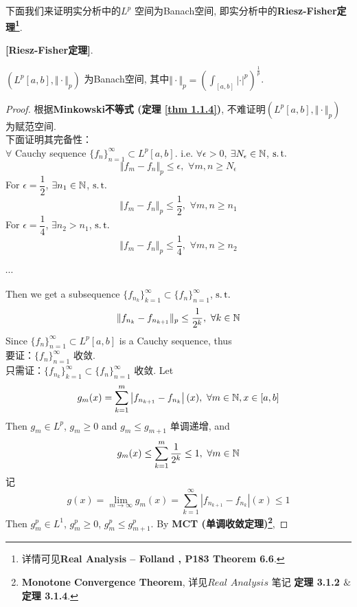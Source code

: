 	
	\vspace{6em}
	下面我们来证明实分析中的$L^p$ 空间为Banach空间, 即实分析中的\textbf{Riesz-Fisher定理\footnote{详情可见\textbf{Real Analysis -- Folland , P183 Theorem 6.6}.}}. 
	\begin{thm}\label{thm 2.1.1}
		\textbf{[Riesz-Fisher定理]}. 
		\begin{center}
			$(L^{p}[a , b] , \Vert \cdot \Vert_p)$ 为Banach空间, 其中$\Vert \cdot \Vert_p = \left( \int_{[a , b]} \left| \cdot \right|^p \right)^{\tfrac{1}{p}}$. 
		\end{center}
		
		\vspace{6em}
		
		\begin{proof}
			根据\textbf{Minkowski不等式 (定理 \ref{thm 1.1.4})}, 不难证明$(L^{p}[a,  b] , \Vert \cdot \Vert_{p})$ 为赋范空间. \\
			下面证明其完备性：\\
			$\forall$ Cauchy sequence $\{ f_n \}_{n = 1}^{\infty} \subset L^{p}[a , b]$. i.e. $\forall \epsilon > 0$, $\exists N_\epsilon \in \mathbb{N}$, $\operatorname{s.t.}$
			\[ \Vert f_m - f_n \Vert_{p} \leq \epsilon , \,\, \forall m , n \geq N_\epsilon \]
			For $\epsilon = \dfrac{1}{2}$, $\exists n_1 \in \mathbb{N}$, $\operatorname{s.t.}$
			\[ \Vert f_m - f_n \Vert_{p} \leq \frac{1}{2} , \,\, \forall m , n \geq n_1 \]
			For $\epsilon = \dfrac{1}{4}$, $\exists n_2 > n_1$, $\operatorname{s.t.}$
			\[ \Vert f_m - f_n \Vert_{p} \leq \frac{1}{4} , \,\, \forall m , n \geq n_2 \]
			\begin{center}
				$\cdots$
			\end{center}
			Then we get a subsequence $\{ f_{n_k} \}_{k = 1}^{\infty} \subset \{ f_n \}_{n = 1}^{\infty}$, $\operatorname{s.t.}$
			\[ \Vert f_{n_k} - f_{n_{k + 1}} \Vert_p \leq \frac{1}{2^k} , \,\, \forall k \in \mathbb{N} \]
			Since $\{ f_n \}_{n = 1}^{\infty} \subset L^{p}[a , b]$ is a Cauchy sequence, thus \\
			要证：$\{ f_n \}_{n = 1}^{\infty}$ 收敛. \\
			只需证：$\{ f_{n_k} \}_{k = 1}^{\infty} \subset \{ f_n \}_{n = 1}^{\infty}$ 收敛. Let
			\[ g_{m}(x) = \sum_{k = 1}^{m} \left| f_{n_{k + 1}} - f_{n_k} \right| (x) , \,\, \forall m \in \mathbb{N} , x \in [a , b] \]
			Then $g_m \in L^p$, $g_m \geq 0$ and $g_{m} \leq g_{m + 1}$ 单调递增, and
			\[ g_{m}(x) \leq \sum_{k = 1}^{m} \frac{1}{2^k} \leq 1 , \,\, \forall m \in \mathbb{N} \]
			记
			\[ g(x) = \lim_{m \to \infty} g_{m}(x) = \sum_{k = 1}^{\infty} \left| f_{n_{k + 1}} - f_{n_k} \right| (x) \leq 1 \]
			Then $g_{m}^p \in L^1$, $g_{m}^p \geq 0$, $g_{m}^p \leq g_{m + 1}^p$. By \textbf{MCT (单调收敛定理)\footnote{\textbf{Monotone Convergence Theorem}, 详见$Real \,\, Analysis$ 笔记 \textbf{定理 3.1.2 $\&$ 定理 3.1.4}.}}, 

\end{proof}
\end{thm}

